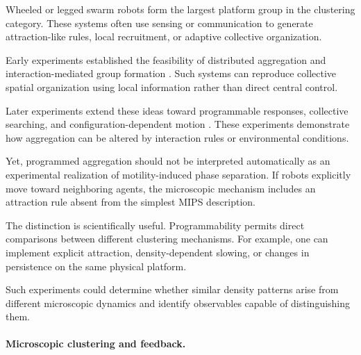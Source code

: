 Wheeled or legged swarm robots form
the largest platform group in the
clustering category. These systems
often use sensing or communication
to generate attraction-like rules,
local recruitment, or adaptive
collective organization.

Early experiments established the
feasibility of distributed aggregation
and interaction-mediated group formation
\cite{Garnier2005aggregationbehaviou,Hamann2008spatialmacroscopic,Arvin2011imitationofhoneybe,Giardina2022collectivephototact,Mijalkov2016engineeringsensoria,Cazenille2016automatedcalibratio,Valentini2015collectivedecision,Guzzi2014bioinspiredobstacle}.
Such systems can reproduce collective
spatial organization using local
information rather than direct
central control.

Later experiments extend these ideas
toward programmable responses,
collective searching, and
configuration-dependent motion
\cite{Vega2023simulatelessexpec,Vega2023indirectswarmcontr,Vega2024agentbasedemulatio,Yang2023collectivechaseem,Sankar2026trendformationwith,Zhou2025activesearchpromot,Liu2026noiseenabledgoala,Dizenhaus2026anonymousleadership,Paramanick2025spontaneousemergenc,Zhang2026emergentnonhermiti,Zheng2026nestedinteractionn,Fruchart2022nonreciprocalphase,Barone2024experimentalandnum,Zhou2024anticipationpromote,Rezeck2021flockingsegregative,Rezeck2026decentralizedemerge}.
These experiments demonstrate how
aggregation can be altered by
interaction rules or environmental
conditions.

Yet, programmed aggregation should
not be interpreted automatically
as an experimental realization
of motility-induced phase separation.
If robots explicitly move toward
neighboring agents, the microscopic
mechanism includes an attraction
rule absent from the simplest
MIPS description.

The distinction is scientifically useful.
Programmability permits direct comparisons
between different clustering mechanisms.
For example, one can implement explicit
attraction, density-dependent slowing,
or changes in persistence on the
same physical platform.

Such experiments could determine
whether similar density patterns
arise from different microscopic
dynamics and identify observables
capable of distinguishing them.

\paragraph*{Microscopic clustering and feedback.}

